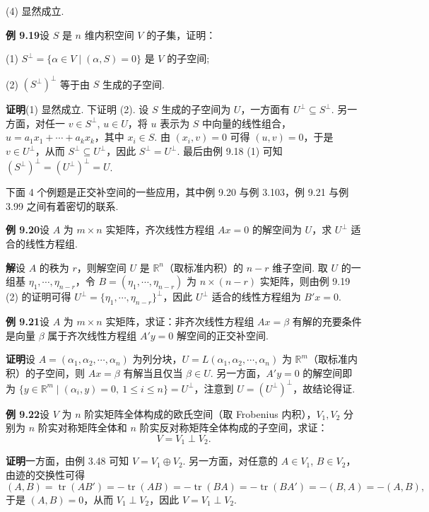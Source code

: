 \documentclass[UTF8, 12pt, fontset=fandol, oneside]{ctexart}
\begin{document}
(4) 显然成立.

\noindent\textbf{例 9.19}\quad 设 $S$ 是 $n$ 维内积空间 $V$ 的子集，证明：

(1) $S^\perp=\{\alpha\in V\mid (\alpha,S)=0\}$ 是 $V$ 的子空间;

(2) $(S^\perp)^\perp$ 等于由 $S$ 生成的子空间.

\noindent\textbf{证明}\quad (1) 显然成立. 下证明 (2). 设 $S$ 生成的子空间为 $U$，一方面有 $U^\perp\subseteq S^\perp$. 另一方面，对任一 $v\in S^\perp$, $u\in U$，将 $u$ 表示为 $S$ 中向量的线性组合，$u=a_1x_1+\cdots+a_kx_k$，其中 $x_i\in S$. 由 $(x_i,v)=0$ 可得 $(u,v)=0$，于是 $v\in U^\perp$，从而 $S^\perp\subseteq U^\perp$，因此 $S^\perp=U^\perp$. 最后由例 9.18 (1) 可知 $(S^\perp)^\perp=(U^\perp)^\perp=U$.

下面 4 个例题是正交补空间的一些应用，其中例 9.20 与例 3.103，例 9.21 与例 3.99 之间有着密切的联系.

\noindent\textbf{例 9.20}\quad 设 $A$ 为 $m\times n$ 实矩阵，齐次线性方程组 $Ax=0$ 的解空间为 $U$，求 $U^\perp$ 适合的线性方程组.

\noindent\textbf{解}\quad 设 $A$ 的秩为 $r$，则解空间 $U$ 是 $\mathbb{R}^n$（取标准内积）的 $n-r$ 维子空间. 取 $U$ 的一组基 $\eta_1,\cdots,\eta_{n-r}$，令 $B=(\eta_1,\cdots,\eta_{n-r})$ 为 $n\times(n-r)$ 实矩阵，则由例 9.19 (2) 的证明可得 $U^\perp=\{\eta_1,\cdots,\eta_{n-r}\}^\perp$，因此 $U^\perp$ 适合的线性方程组为 $B'x=0$.

\noindent\textbf{例 9.21}\quad 设 $A$ 为 $m\times n$ 实矩阵，求证：非齐次线性方程组 $Ax=\beta$ 有解的充要条件是向量 $\beta$ 属于齐次线性方程组 $A'y=0$ 解空间的正交补空间.

\noindent\textbf{证明}\quad 设 $A=(\alpha_1,\alpha_2,\cdots,\alpha_n)$ 为列分块，$U=L(\alpha_1,\alpha_2,\cdots,\alpha_n)$ 为 $\mathbb{R}^m$（取标准内积）的子空间，则 $Ax=\beta$ 有解当且仅当 $\beta\in U$. 另一方面，$A'y=0$ 的解空间即为 $\{y\in\mathbb{R}^m\mid (\alpha_i,y)=0,\ 1\le i\le n\}=U^\perp$，注意到 $U=(U^\perp)^\perp$，故结论得证.

\noindent\textbf{例 9.22}\quad 设 $V$ 为 $n$ 阶实矩阵全体构成的欧氏空间（取 Frobenius 内积），$V_1,V_2$ 分别为 $n$ 阶实对称矩阵全体和 $n$ 阶实反对称矩阵全体构成的子空间，求证：
\[
V=V_1\perp V_2.
\]

\noindent\textbf{证明}\quad 一方面，由例 3.48 可知 $V=V_1\oplus V_2$. 另一方面，对任意的 $A\in V_1$, $B\in V_2$，由迹的交换性可得
\[
(A,B)=\operatorname{tr}(AB')=-\operatorname{tr}(AB)=-\operatorname{tr}(BA)=-\operatorname{tr}(BA')=-(B,A)=-(A,B),
\]
于是 $(A,B)=0$，从而 $V_1\perp V_2$，因此 $V=V_1\perp V_2$.
\end{document}
